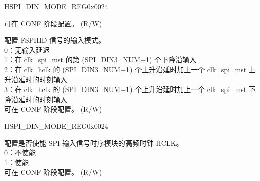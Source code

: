 \begin{register}{H}{SPI\_DIN\_MODE\_REG}{0x0024}
\begin{regdesc}
\begin{reglist}
可在 CONF 阶段配置。 (R/W)
\label{fielddesc:SPIDIN3MODE}\item [SPI\_DIN3\_MODE] 配置 FSPIHD 信号的输入模式。 \\
0：无输入延迟 \\
1：在 clk\_spi\_mst 的第 (\hyperref[fielddesc:SPIDIN3NUM]{SPI\_DIN3\_NUM}+1) 个下降沿输入 \\
2：在 clk\_hclk 的 (\hyperref[fielddesc:SPIDIN3NUM]{SPI\_DIN3\_NUM}+1) 个上升沿延时加上一个 clk\_spi\_mst 上升沿延时的时刻输入 \\
3：在 clk\_hclk 的 (\hyperref[fielddesc:SPIDIN3NUM]{SPI\_DIN3\_NUM}+1) 个上升沿延时加上一个 clk\_spi\_mst 下降沿延时的时刻输入 \\
可在 CONF 阶段配置。 (R/W)

\item [见下页...]
\end{reglist}\end{regdesc}
\end{register}

\addtocounter{Regfloat}{-1}
\begin{register}{H}{SPI\_DIN\_MODE\_REG}{0x0024}
\begin{regdesc}\begin{reglist}
\item [接上页...]

\label{fielddesc:SPITIMINGHCLKACTIVE}\item [SPI\_TIMING\_HCLK\_ACTIVE] 配置是否使能 SPI 输入信号时序模块的高频时钟 HCLK。\\
0：不使能 \\
1：使能 \\
可在 CONF 阶段配置。 (R/W)
\end{reglist}\end{regdesc}
\end{register}


